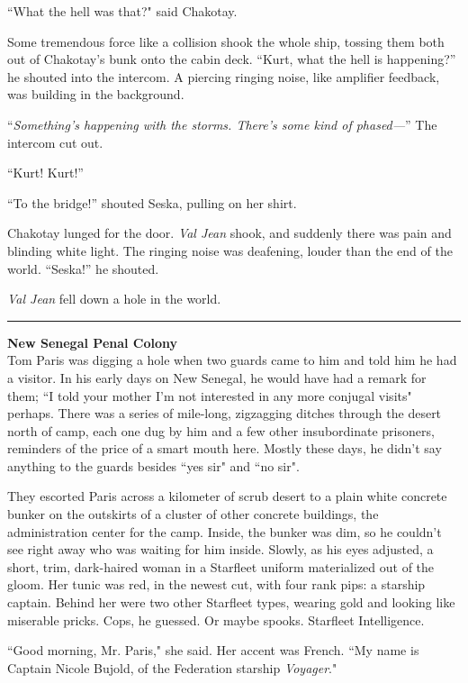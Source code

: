 \documentclass[twoside,letterpaper,12pt]{memoir}
\begin{document}
``What the hell was that?" said Chakotay.

Some tremendous force like a collision shook the whole ship, tossing them both out of Chakotay's bunk onto the cabin deck. ``Kurt, what the hell is happening?'' he shouted into the intercom. A piercing ringing noise, like amplifier feedback, was building in the background.

``\textit{Something's happening with the storms. There's some kind of phased---}'' The intercom cut out.

``Kurt! Kurt!''

``To the bridge!'' shouted Seska, pulling on her shirt.

Chakotay lunged for the door. \textit{Val Jean} shook, and suddenly there was pain and blinding white light. The ringing noise was deafening, louder than the end of the world. ``Seska!'' he shouted.

\textit{Val Jean} fell down a hole in the world.

\fancybreak{\rule{3cm}{0.4 pt}}

\noindent\textbf{New Senegal Penal Colony}\\

Tom Paris was digging a hole when two guards came to him and told him he had a visitor. In his early days on New Senegal, he would have had a remark for them; ``I told your mother I'm not interested in any more conjugal visits" perhaps. There was a series of mile-long, zigzagging ditches through the desert north of camp, each one dug by him and a few other insubordinate prisoners, reminders of the price of a smart mouth here. Mostly these days, he didn't say anything to the guards besides ``yes sir" and ``no sir".

They escorted Paris across a kilometer of scrub desert to a plain white concrete bunker on the outskirts of a cluster of other concrete buildings, the administration center for the camp. Inside, the bunker was dim, so he couldn't see right away who was waiting for him inside. Slowly, as his eyes adjusted, a short, trim, dark-haired woman in a Starfleet uniform materialized out of the gloom. Her tunic was red, in the newest cut, with four rank pips: a starship captain. Behind her were two other Starfleet types, wearing gold and looking like miserable pricks. Cops, he guessed. Or maybe spooks. Starfleet Intelligence.

``Good morning, Mr. Paris," she said. Her accent was French. ``My name is Captain Nicole Bujold, of the Federation starship \textit{Voyager}."
\end{document}
